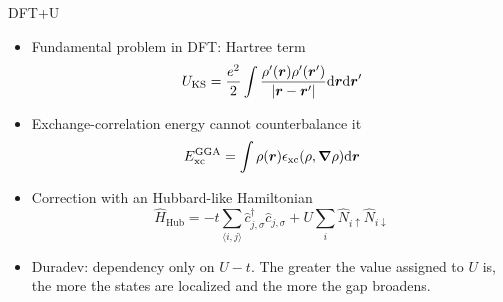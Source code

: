 \documentclass[11pt, xcolor=dvipsnames, aspectratio=43]{beamer}
\newcommand{\oper}[1]{\hat{#1}}
\renewcommand{\vec}[1]{\mathbf{\boldsymbol{#1}}}
\newcommand{\adjoint}[1]{#1^\dagger}
\newcommand{\adjop}[1]{\adjoint{\oper{#1}}}
\newcommand{\rr}[1]{#1(\vec{r})}
\newcommand{\dr}{\differential \vec{r}}
\begin{document}
\begin{frame}{DFT+U}
    \begin{itemize}
        \item<1-> Fundamental problem in DFT: \alert{Hartree} term
            \begin{equation*}
                U_\text{KS} = \frac{e^2}{2} \int \frac{\rho'(\vec{r})\rho'(\vec{r}')}{|\vec{r}-\vec{r}'|} \dr \dr'
            \end{equation*}
        \item<2-> Exchange-correlation energy cannot counterbalance it
            \begin{equation*}
                E_\text{xc}^\text{GGA}  = \int \rr{\rho} \epsilon_\text{xc}(\rho, \grad \rho) \dr
            \end{equation*}
        \item<3-> Correction with an \alert{Hubbard}-like Hamiltonian
            \begin{equation*}
                \oper{H}_\text{Hub} = -t \sum_{\langle i,j \rangle} \adjop{c}_{j,\sigma}\oper{c}_{j,\sigma} + U \sum_i \oper{N}_{i\uparrow} \oper{N}_{i\downarrow}
            \end{equation*}
        \item<4-> \alert{Duradev}: dependency only on $U-t$. The greater the value assigned to $U$ is, the more the states are \alert{localized} and the more the gap broadens.
    \end{itemize}
\end{frame}
\end{document}
